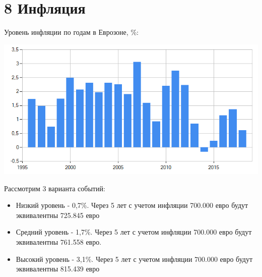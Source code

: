 \section*{8 Инфляция}

Уровень инфляции по годам в Еврозоне, \%:

\includegraphics[width=16cm]{pics/alina/inflation.png}

Рассмотрим 3 варианта событий:

\begin{itemize}
	\item Низкий уровень - 0,7\%. Через 5 лет с учетом инфляции 700.000 евро будут эквивалентны 725.845 евро
	\item Средний уровень - 1,7\%. Через 5 лет с учетом инфляции 700.000 евро будут эквивалентны 761.558 евро.
	\item Высокий уровень - 3,1\%. Через 5 лет с учетом инфляции 700.000 евро будут эквивалентны 815.439 евро
\end{itemize}